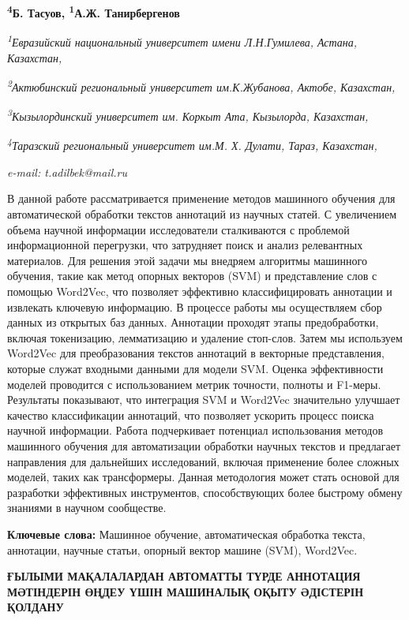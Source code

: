 {\bfseries \textsuperscript{4}Б. Тасуов, \textsuperscript{1}А.Ж.
Танирбергенов\textsuperscript{\envelope }}

\emph{\textsuperscript{1}Евразийский национальный университет имени
Л.Н.Гумилева, Астана, Казахстан,}

\emph{\textsuperscript{2}Актюбинский региональный университет
им.К.Жубанова, Актобе, Казахстан,}

\emph{\textsuperscript{3}Кызылординский университет им. Коркыт Ата,
Кызылорда, Казахстан,}

\emph{\textsuperscript{4}Таразский региональный университет им.М. Х.
Дулати, Тараз, Казахстан,}

\emph{e-mail: t.adilbek@mail.ru}

В данной работе рассматривается применение методов машинного обучения
для автоматической обработки текстов аннотаций из научных статей. С
увеличением объема научной информации исследователи сталкиваются с
проблемой информационной перегрузки, что затрудняет поиск и анализ
релевантных материалов. Для решения этой задачи мы внедряем алгоритмы
машинного обучения, такие как метод опорных векторов (SVM) и
представление слов с помощью Word2Vec, что позволяет эффективно
классифицировать аннотации и извлекать ключевую информацию. В процессе
работы мы осуществляем сбор данных из открытых баз данных. Аннотации
проходят этапы предобработки, включая токенизацию, лемматизацию и
удаление стоп-слов. Затем мы используем Word2Vec для преобразования
текстов аннотаций в векторные представления, которые служат входными
данными для модели SVM. Оценка эффективности моделей проводится с
использованием метрик точности, полноты и F1-меры. Результаты
показывают, что интеграция SVM и Word2Vec значительно улучшает качество
классификации аннотаций, что позволяет ускорить процесс поиска научной
информации. Работа подчеркивает потенциал использования методов
машинного обучения для автоматизации обработки научных текстов и
предлагает направления для дальнейших исследований, включая применение
более сложных моделей, таких как трансформеры. Данная методология может
стать основой для разработки эффективных инструментов, способствующих
более быстрому обмену знаниями в научном сообществе.

{\bfseries Ключевые слова:} Машинное обучение, автоматическая обработка
текста, аннотации, научные статьи, опорный вектор машине (SVM),
Word2Vec.

{\bfseries ҒЫЛЫМИ МАҚАЛАЛАРДАН АВТОМАТТЫ ТҮРДЕ АННОТАЦИЯ МӘТІНДЕРІН ӨҢДЕУ
ҮШІН МАШИНАЛЫҚ ОҚЫТУ ӘДІСТЕРІН ҚОЛДАНУ}

